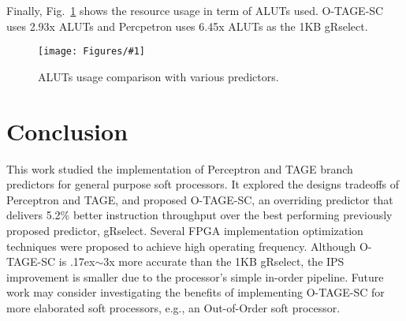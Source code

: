 \documentclass[conference]{IEEEtran}
\newcommand{\mytilde}{{\raise.17ex\hbox{$\scriptstyle\sim$}}}
\newcommand{\kfig}[4]{ %
        \begin{figure}[!t]
        \centering
        \texttt{[image: Figures/\#1]}
        \vspace{-1mm}
        \caption{#3}
        \label{#2}
        \end{figure}
}
\begin{document}
Finally, Fig.~\ref{fig:adarea} shows the resource usage in term of ALUTs used. \mbox{O-TAGE-SC} uses 2.93x ALUTs and Percpetron uses 6.45x ALUTs as the 1KB gRselect.
\kfig{adarea.pdf}{fig:adarea}{ALUTs usage comparison with various predictors.}{angle = 0, trim = 0.9in 2.7in 0.7in 2.7in, clip, width=0.4\textwidth}

\section{Conclusion}
This work studied the implementation of  Perceptron and TAGE branch predictors for general purpose soft processors. It explored the designs tradeoffs of Perceptron and TAGE, and proposed \mbox{O-TAGE-SC}, an overriding predictor that delivers 5.2\% better instruction throughput over the best performing previously proposed predictor, gRselect. Several FPGA implementation optimization techniques were proposed to achieve high operating frequency. Although \mbox{O-TAGE-SC} is \mytilde 3x more accurate than the 1KB gRselect, the IPS improvement is  smaller due to the processor's simple in-order pipeline. Future work may consider investigating the benefits of implementing \mbox{O-TAGE-SC} for more elaborated soft processors, e.g., an Out-of-Order soft processor. 









\end{document}
